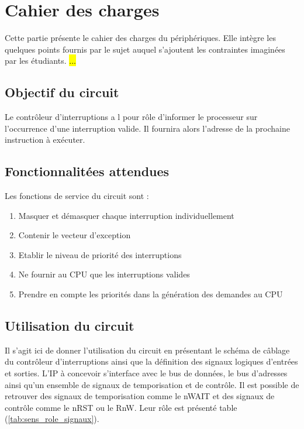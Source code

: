 \section{Cahier des charges}
Cette partie présente le cahier des charges du périphériques.
Elle intègre les quelques points fournis par le sujet auquel s'ajoutent les contraintes imaginées par les étudiants.
\hl{...}
\subsection{Objectif du circuit}
Le contrôleur d'interruptions a l pour rôle d'informer le processeur sur l’occurrence d'une interruption valide.
Il fournira alors l’adresse de la prochaine instruction à exécuter.

\subsection{Fonctionnalitées attendues}
Les fonctions de service du circuit sont :
\begin{enumerate}
    \item Masquer et démasquer chaque interruption individuellement
    \item Contenir le vecteur d'exception
    \item Etablir le niveau de priorité des interruptions
    \item Ne fournir au \gls{CPU} que les interruptions valides
    \item Prendre en compte les priorités dans la génération des demandes au \gls{CPU}
\end{enumerate}
\subsection{Utilisation du circuit}
	
Il s'agit ici de donner l'utilisation du circuit en présentant le schéma de câblage du contrôleur d'interruptions ainsi que la définition des signaux logiques d'entrées et sorties.
L'\gls{IP} à concevoir s'interface avec le bus de données, le bus d'adresses ainsi qu'un ensemble de signaux de temporisation et de contrôle.
Il est possible de retrouver des signaux de temporisation comme le nWAIT et des signaux de contrôle comme le nRST ou le RnW.
Leur rôle est présenté table (\ref{tab:sens_role_signaux}).
	
